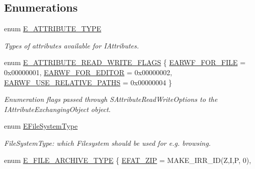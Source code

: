 \subsection*{Enumerations}
\begin{DoxyCompactItemize}
\item 
\mbox{\label{namespaceirr_1_1io_a874a5f14dbe2e45c40c2bb29e9f0ebcb}} 
enum \hyperlink{namespaceirr_1_1io_a874a5f14dbe2e45c40c2bb29e9f0ebcb}{E\+\_\+\+A\+T\+T\+R\+I\+B\+U\+T\+E\+\_\+\+T\+Y\+PE} \begin{DoxyCompactList}\small\item\em Types of attributes available for I\+Attributes. \end{DoxyCompactList}
\item 
enum \hyperlink{namespaceirr_1_1io_a84923cf86af38e49c6ec5ee36903d782}{E\+\_\+\+A\+T\+T\+R\+I\+B\+U\+T\+E\+\_\+\+R\+E\+A\+D\+\_\+\+W\+R\+I\+T\+E\+\_\+\+F\+L\+A\+GS} \{ \hyperlink{namespaceirr_1_1io_a84923cf86af38e49c6ec5ee36903d782aaa5edcb75733f65299b9cdd64e42513b}{E\+A\+R\+W\+F\+\_\+\+F\+O\+R\+\_\+\+F\+I\+LE} = 0x00000001, 
\hyperlink{namespaceirr_1_1io_a84923cf86af38e49c6ec5ee36903d782a9475477129f567bd0f284620fd779334}{E\+A\+R\+W\+F\+\_\+\+F\+O\+R\+\_\+\+E\+D\+I\+T\+OR} = 0x00000002, 
\hyperlink{namespaceirr_1_1io_a84923cf86af38e49c6ec5ee36903d782ace3aad4e68fc4d12473c1e4ef39d62de}{E\+A\+R\+W\+F\+\_\+\+U\+S\+E\+\_\+\+R\+E\+L\+A\+T\+I\+V\+E\+\_\+\+P\+A\+T\+HS} = 0x00000004
 \}\begin{DoxyCompactList}\small\item\em Enumeration flags passed through S\+Attribute\+Read\+Write\+Options to the I\+Attribute\+Exchanging\+Object object. \end{DoxyCompactList}
\item 
\mbox{\label{namespaceirr_1_1io_a22364f1caf06442a70f6198025af3fe9}} 
enum \hyperlink{namespaceirr_1_1io_a22364f1caf06442a70f6198025af3fe9}{E\+File\+System\+Type} \begin{DoxyCompactList}\small\item\em File\+System\+Type\+: which Filesystem should be used for e.\+g. browsing. \end{DoxyCompactList}
\item 
enum \hyperlink{namespaceirr_1_1io_adb3e3c445ec8e608ed1f0f93306da14f}{E\+\_\+\+F\+I\+L\+E\+\_\+\+A\+R\+C\+H\+I\+V\+E\+\_\+\+T\+Y\+PE} \{ \newline
\hyperlink{namespaceirr_1_1io_adb3e3c445ec8e608ed1f0f93306da14fa63010a52f2efb42f3c85b91ecf077004}{E\+F\+A\+T\+\_\+\+Z\+IP} = M\+A\+K\+E\+\_\+\+I\+R\+R\+\_\+\+ID(\textquotesingle{}Z\textquotesingle{},\textquotesingle{}I\textquotesingle{},\textquotesingle{}P\textquotesingle{}, 0), 

\end{DoxyCompactItemize}
